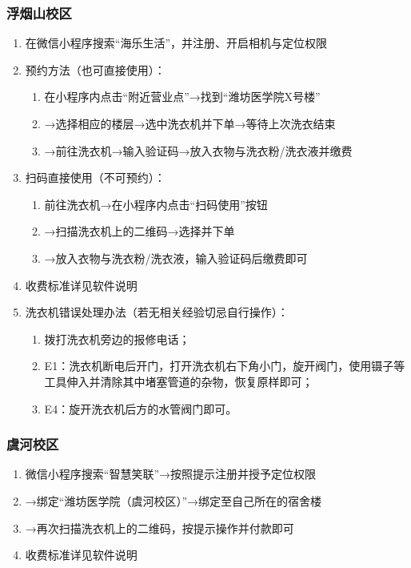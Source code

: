 \subsubsection[浮烟山校区]{浮烟山校区}
\label{washing_machine_f}
\begin{enumerate}
    \item 在微信小程序搜索“海乐生活”，并注册、开启相机与定位权限
    \item 预约方法（也可直接使用）：
          \begin{enumerate}
              \item 在小程序内点击“附近营业点”→找到“潍坊医学院X号楼”
              \item →选择相应的楼层→选中洗衣机并下单→等待上次洗衣结束
              \item →前往洗衣机→输入验证码→放入衣物与洗衣粉/洗衣液并缴费
          \end{enumerate}
    \item 扫码直接使用（不可预约）：
          \begin{enumerate}
              \item 前往洗衣机→在小程序内点击“扫码使用”按钮
              \item →扫描洗衣机上的二维码→选择并下单
              \item →放入衣物与洗衣粉/洗衣液，输入验证码后缴费即可
          \end{enumerate}
    \item 收费标准详见软件说明
    \item 洗衣机错误处理办法（若无相关经验切忌自行操作）：
          \begin{enumerate}
              \item 拨打洗衣机旁边的报修电话；
              \item E1：洗衣机断电后开门，打开洗衣机右下角小门，旋开阀门，使用镊子等工具伸入并清除其中堵塞管道的杂物，恢复原样即可；
              \item E4：旋开洗衣机后方的水管阀门即可。
          \end{enumerate}
\end{enumerate}
\subsubsection[虞河校区]{虞河校区}
\label{washing_machine_y}
\begin{enumerate}
    \item 微信小程序搜索“智慧笑联”→按照提示注册并授予定位权限
    \item →绑定“潍坊医学院（虞河校区）”→绑定至自己所在的宿舍楼
    \item →再次扫描洗衣机上的二维码，按提示操作并付款即可
    \item 收费标准详见软件说明
\end{enumerate}


